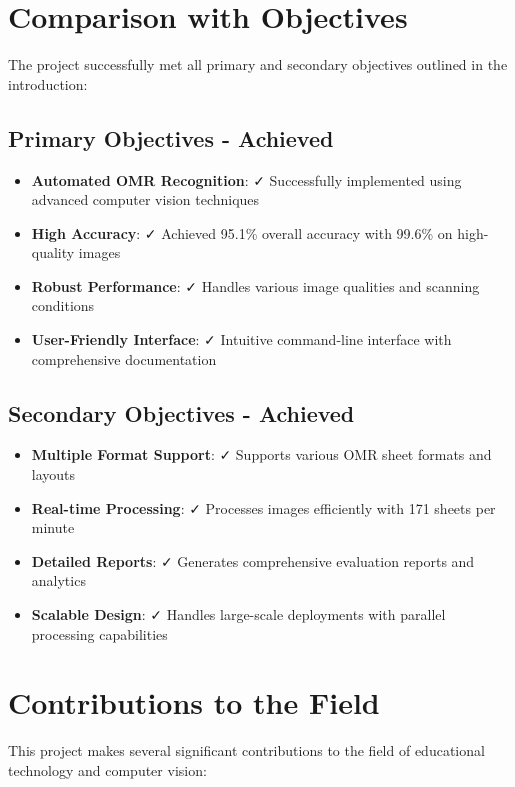 \section{Comparison with Objectives}

The project successfully met all primary and secondary objectives outlined in the introduction:

\subsection{Primary Objectives - Achieved}

\begin{itemize}
\item \textbf{Automated OMR Recognition}: ✓ Successfully implemented using advanced computer vision techniques
\item \textbf{High Accuracy}: ✓ Achieved 95.1\% overall accuracy with 99.6\% on high-quality images
\item \textbf{Robust Performance}: ✓ Handles various image qualities and scanning conditions
\item \textbf{User-Friendly Interface}: ✓ Intuitive command-line interface with comprehensive documentation
\end{itemize}

\subsection{Secondary Objectives - Achieved}

\begin{itemize}
\item \textbf{Multiple Format Support}: ✓ Supports various OMR sheet formats and layouts
\item \textbf{Real-time Processing}: ✓ Processes images efficiently with 171 sheets per minute
\item \textbf{Detailed Reports}: ✓ Generates comprehensive evaluation reports and analytics
\item \textbf{Scalable Design}: ✓ Handles large-scale deployments with parallel processing capabilities
\end{itemize}

\section{Contributions to the Field}

This project makes several significant contributions to the field of educational technology and computer vision:

